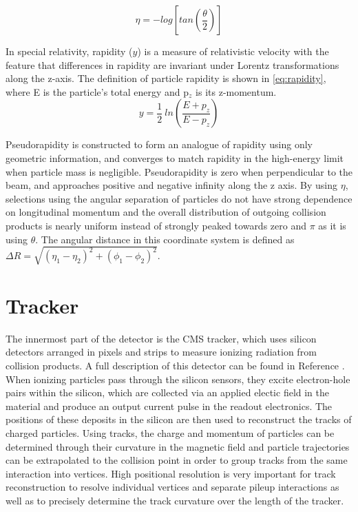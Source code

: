 \begin{equation}
    \label{eq:pseudo}
    \eta = - log \left[tan\left(\frac{\theta}{2}\right)\right]
\end{equation}

In special relativity, rapidity ($y$) is a measure of relativistic velocity with the feature that differences in rapidity are invariant under Lorentz transformations along the z-axis.
The definition of particle rapidity is shown in \cref{eq:rapidity}, where E is the particle's total energy and p$_z$ is its z-momentum.
\begin{equation}
    \label{eq:rapidity}
    y = \frac{1}{2} ~ln \left(\frac{E+p_z}{E-p_z}\right)
\end{equation}

Pseudorapidity is constructed to form an analogue of rapidity using only geometric information, and converges to match rapidity in the high-energy limit when particle mass is negligible.
Pseudorapidity is zero when perpendicular to the beam, and approaches positive and negative infinity along the z axis. 
By using $\eta$, selections using the angular separation of particles do not have strong dependence on longitudinal momentum and the overall distribution of outgoing collision products is nearly uniform instead of strongly peaked towards zero and $\pi$ as it is using $\theta$.  
The angular distance in this coordinate system is defined as $\Delta R = \sqrt{(\eta_1-\eta_2)^2+(\phi_1-\phi_2)^2}$.

\section{Tracker}
The innermost part of the detector is the CMS tracker, which uses silicon detectors arranged in pixels and strips to measure ionizing radiation from collision products. 
A full description of this detector can be found in Reference \cite{trackerTDR}.
When ionizing particles pass through the silicon sensors, they excite electron-hole pairs within the silicon, which are collected via an applied electic field in the material and produce an output current pulse in the readout electronics.
The positions of these deposits in the silicon are then used to reconstruct the tracks of charged particles.
Using tracks, the charge and momentum of particles can be determined through their curvature in the magnetic field and particle trajectories can be extrapolated to the collision point in order to group tracks from the same interaction into vertices. 
High positional resolution is very important for track reconstruction to resolve individual vertices and separate pileup interactions as well as to precisely determine the track curvature over the length of the tracker. 

